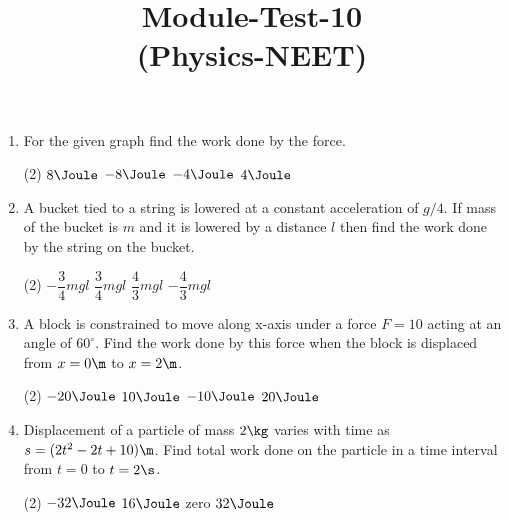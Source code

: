 \documentclass{article}
\title{Module-Test-10\\(Physics-NEET)}
\begin{document}
\maketitle

\neetSectionA
\begin{enumerate}
\item For the given graph find the work done by the force.
\begin{center}
\end{center}
\begin{tasks}(2)
	\task $8\Joule$
	\task $-8\Joule$
	\task $-4\Joule$
	\task $4\Joule$\ans
\end{tasks}


\item A bucket tied to a string is lowered at a constant acceleration of $g/4$. If mass of the bucket is $m$ and it is lowered by a distance $l$ then find the work done by the string on the bucket.
\begin{tasks}(2)
	\task $-\dfrac{3}{4}mgl$\ans
	\task $\dfrac{3}{4}mgl$
	\task $\dfrac{4}{3}mgl$
	\task $-\dfrac{4}{3}mgl$
\end{tasks}


\item A block is constrained to move along x-axis under a force $F = 10$ acting at an angle of $60^\circ$. Find the work done by this force when the block is displaced from $x = 0 \m$ to $x = 2 \m$.
\begin{center}
\end{center}
\begin{tasks}(2)
	\task $-20\Joule$
	\task $10\Joule$\ans
	\task $-10\Joule$
	\task $20\Joule$
\end{tasks}


\item Displacement of a particle of mass $2 \kg$ varies with time as $s = (2t^2 - 2t + 10) \m$. Find total work done on the particle in a time interval from $t = 0$ to $t = 2 \s$.
\begin{tasks}(2)
	\task $-32\Joule$
	\task $16\Joule$
	\task zero
	\task $32\Joule$\ans
\end{tasks}


\end{enumerate}
\end{document}
